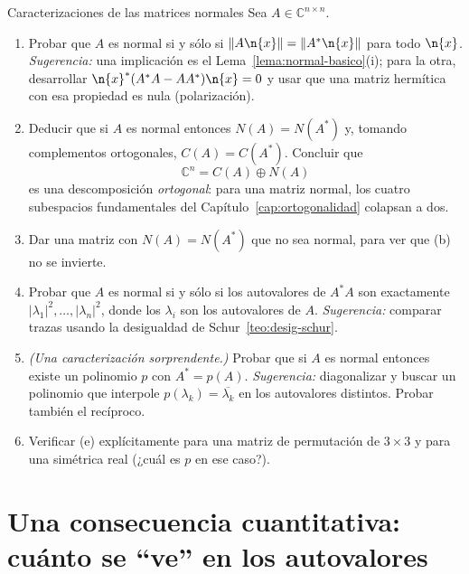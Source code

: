 \begin{entrega}{Caracterizaciones de las matrices normales}\label{ent:normales}
Sea $A\in\mathbb{C}^{n\times n}$.

\begin{enumerate}[label=\textbf{(\alph*)},itemsep=3pt,topsep=4pt]
\item Probar que $A$ es normal si y sólo si $\|A\n{x}\|=\|A^{*}\n{x}\|$ para todo
$\n{x}$. \emph{Sugerencia:} una implicación es el Lema~\ref{lema:normal-basico}(i);
para la otra, desarrollar $\n{x}^{*}(A^{*}A-AA^{*})\n{x}=0$ y usar que una matriz
hermítica con esa propiedad es nula (polarización).

\item Deducir que si $A$ es normal entonces $N(A)=N(A^{*})$ y, tomando complementos
ortogonales, $C(A)=C(A^{*})$. Concluir que
\[
\mathbb{C}^{n}=C(A)\oplus N(A)
\]
es una descomposición \emph{ortogonal}: para una matriz normal, los cuatro subespacios
fundamentales del Capítulo~\ref{cap:ortogonalidad} colapsan a dos.

\item Dar una matriz con $N(A)=N(A^{*})$ que no sea normal, para ver que (b) no se
invierte.

\item Probar que $A$ es normal si y sólo si los autovalores de $A^{*}A$ son exactamente
$|\lambda_1|^{2},\dots,|\lambda_n|^{2}$, donde los $\lambda_i$ son los autovalores de
$A$. \emph{Sugerencia:} comparar trazas usando la desigualdad de
Schur~\ref{teo:desig-schur}.

\item \emph{(Una caracterización sorprendente.)} Probar que si $A$ es normal entonces
existe un polinomio $p$ con $A^{*}=p(A)$. \emph{Sugerencia:} diagonalizar y buscar un
polinomio que interpole $p(\lambda_k)=\overline{\lambda_k}$ en los autovalores distintos.
Probar también el recíproco.

\item Verificar (e) explícitamente para una matriz de permutación de $3\times3$ y para
una simétrica real (¿cuál es $p$ en ese caso?).
\end{enumerate}

\medskip
{}
\end{entrega}

\section{Una consecuencia cuantitativa: cuánto se ``ve'' en los autovalores}\label{sec:desig-schur}

